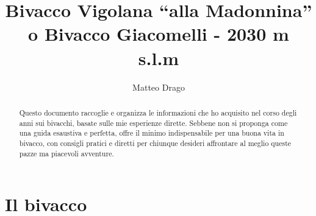\documentclass{article}
\title{\textbf{Bivacco Vigolana “alla Madonnina” o Bivacco Giacomelli - 2030 m s.l.m}}
\author{Matteo Drago}
\begin{document}
\maketitle
\thispagestyle{fancy} %

\begin{abstract}
Questo documento raccoglie e organizza le informazioni che ho acquisito nel corso degli anni sui bivacchi, basate sulle mie esperienze dirette. Sebbene non si proponga come una guida esaustiva e perfetta, offre il minimo indispensabile per una buona vita in bivacco, con consigli pratici e diretti per chiunque desideri affrontare al meglio queste pazze ma piacevoli avventure.
\end{abstract}

\section{Il bivacco}
\end{document}
